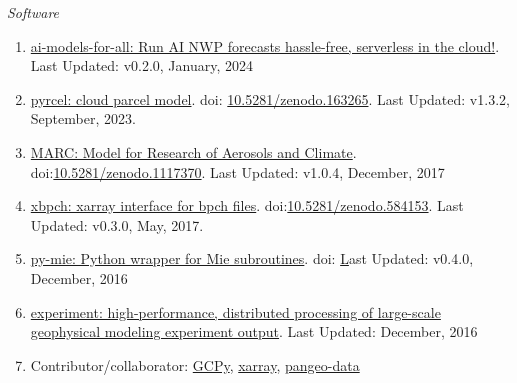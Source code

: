 \documentclass[11pt,letterpaper]{article}
\begin{document}
\bigskip
\emph{Software}
\medskip
\begin{enumerate}[itemindent=-10pt]

\item \href{https://github.com/darothen/ai-models-for-all}{ai-models-for-all: Run AI NWP forecasts hassle-free, serverless in the cloud!}. Last Updated: v0.2.0, January, 2024

\item \href{https://github.com/darothen/pyrcel}{pyrcel: cloud parcel model}. doi: \href{https://doi.org/10.5281/zenodo.163265}{10.5281/zenodo.163265}. Last Updated: v1.3.2, September, 2023.

\item \href{https://github.mit.edu/marc/marc_cesm}{MARC: Model for Research of Aerosols and Climate}. doi:\href{https://doi.org/10.5281/zenodo.1117370}{10.5281/zenodo.1117370}. Last Updated: v1.0.4, December, 2017

\item \href{https://github.com/darothen/xbpch}{xbpch: xarray interface for bpch files}. doi:\href{https://doi.org/10.5281/zenodo.584153}{10.5281/zenodo.584153}. Last Updated: v0.3.0, May, 2017.

\item \href{https://github.com/darothen/py-mie}{py-mie: Python wrapper for Mie subroutines}. doi: \href{http://doi.org/10.5281/zenodo.192510} Last Updated: v0.4.0, December, 2016

\item \href{https://github.com/darothen/experiment}{experiment: high-performance, distributed processing of large-scale geophysical modeling experiment output}. Last Updated: December, 2016

\item Contributor/collaborator: \href{https://bitbucket.org/gcst/gcpy/}{GCPy}, \href{https://github.com/pydata/xarray}{xarray}, \href{https://github.com/pangeo-data/pangeo}{pangeo-data}

\end{enumerate}


\newpage
\end{document}
